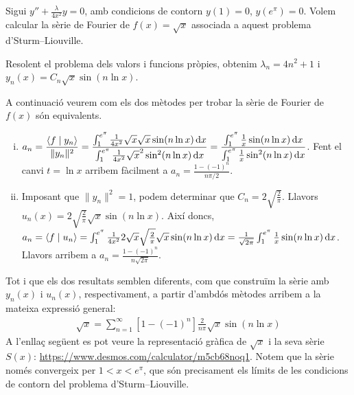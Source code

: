 \begin{example}
    Sigui $\displaystyle y'' + \frac{\lambda}{4x^{2}} y = 0$, amb condicions de contorn $y(1) = 0$, $y(e^{\pi}) = 0$. Volem calcular la sèrie de Fourier de $f(x) = \sqrt{x}$ associada a aquest problema d'Sturm--Liouville.

    Resolent el problema dels valors i funcions pròpies, obtenim $\lambda_{n} = 4n^{2} + 1$ i $y_{n}(x) = C_{n} \sqrt{x} \sin (n \ln x)$.

    A continuació veurem com els dos mètodes per trobar la sèrie de Fourier de $f(x)$ són equivalents.
    \begin{enumerate}[i)]
        \item $\displaystyle a_{n} = \frac{\left< f \mid y_{n} \right>}{\| y_{n} \|^{2}} = \frac{\int_{1}^{e^{\pi}}\frac{1}{4x^{2}} \sqrt{x} \sqrt{x} \sin (n \ln x) \mathop{}\!\mathrm{d} x}{\int_{1}^{e^{\pi}}\frac{1}{4x^{2}} \sqrt{x}^{2} \sin^{2} (n \ln x) \mathop{}\!\mathrm{d} x} = \frac{\int_{1}^{e^{\pi}} \frac{1}{x} \sin (n \ln x) \mathop{}\!\mathrm{d} x}{\int_{1}^{e^{\pi}} \frac{1}{x} \sin^{2} (n \ln x) \mathop{}\!\mathrm{d} x}$. Fent el canvi $t = \ln x$ arribem fàcilment a $\boxed{a_{n} = \frac{1-(-1)^{n}}{n \pi/2}}$.
        \item Imposant que $\| y_{n} \|^{2} = 1$, podem determinar que $ C_{n} = 2\sqrt{\frac{2}{\pi}}$. Llavors $u_{n}(x) = 2\sqrt{\frac{2}{\pi}} \sqrt{x} \sin (n \ln x)$. Així doncs, $ a_{n} = \left< f \mid u_{n} \right> = \int_{1}^{e^{\pi}} \frac{1}{4 x^{2}} 2 \sqrt{x} \sqrt{\frac{2}{\pi}} \sqrt{x} \sin (n \ln x) \mathop{}\!\mathrm{d} x = \frac{1}{\sqrt{2\pi}} \int_{1}^{e^{\pi}} \frac{1}{x} \sin (n \ln x) \mathop{}\!\mathrm{d} x$. Llavors arribem a $\boxed{a_{n} = \frac{1-(-1)^{n}}{n \sqrt{2 \pi}}}$.
    \end{enumerate}
    Tot i que els dos resultats semblen diferents, com que construïm la sèrie amb $y_{n}(x)$ i $u_{n}(x)$, respectivament, a partir d'ambdós mètodes arribem a la mateixa expressió general:
    \begin{align*}
        \boxed{\sqrt{x} = \sum_{n=1}^{\infty} [1 - (-1)^{n}] \frac{2}{n \pi} \sqrt{x} \sin (n \ln x)}
    \end{align*}
    A l'enllaç següent es pot veure la representació gràfica de $\sqrt{x}$ i la seva sèrie $S(x)$: \url{https://www.desmos.com/calculator/m5cb68noq1}. Notem que la sèrie només convergeix per $1 < x < e^{\pi}$, que són precisament els límits de les condicions de contorn del problema d'Sturm--Liouville.
\end{example}
